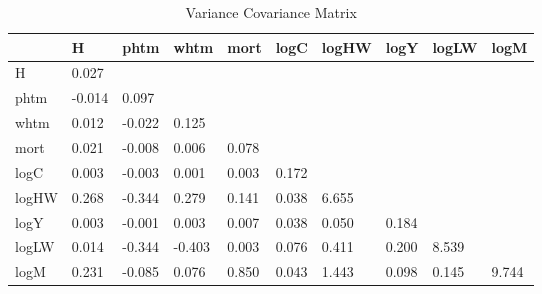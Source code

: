 \begin{table}[htbp]
\caption{\label{clabel} Variance Covariance Matrix}\centering\medskip
\begin{tabular}{llllllllll} \hline \hline
 & H  & phtm  & whtm  & mort  & logC  & logHW  & logY  & logLW  & logM  \\  \hline 
H &     0.027 \\  
phtm &    -0.014 &     0.097 \\  
whtm &     0.012 &    -0.022 &     0.125 \\  
mort &     0.021 &    -0.008 &     0.006 &     0.078 \\  
logC &     0.003 &    -0.003 &     0.001 &     0.003 &     0.172 \\  
logHW &     0.268 &    -0.344 &     0.279 &     0.141 &     0.038 &     6.655 \\  
logY &     0.003 &    -0.001 &     0.003 &     0.007 &     0.038 &     0.050 &     0.184 \\  
logLW &     0.014 &    -0.344 &    -0.403 &     0.003 &     0.076 &     0.411 &     0.200 &     8.539 \\  
logM &     0.231 &    -0.085 &     0.076 &     0.850 &     0.043 &     1.443 &     0.098 &     0.145 &     9.744 \\  
\hline \hline \end{tabular}
\end{table}
